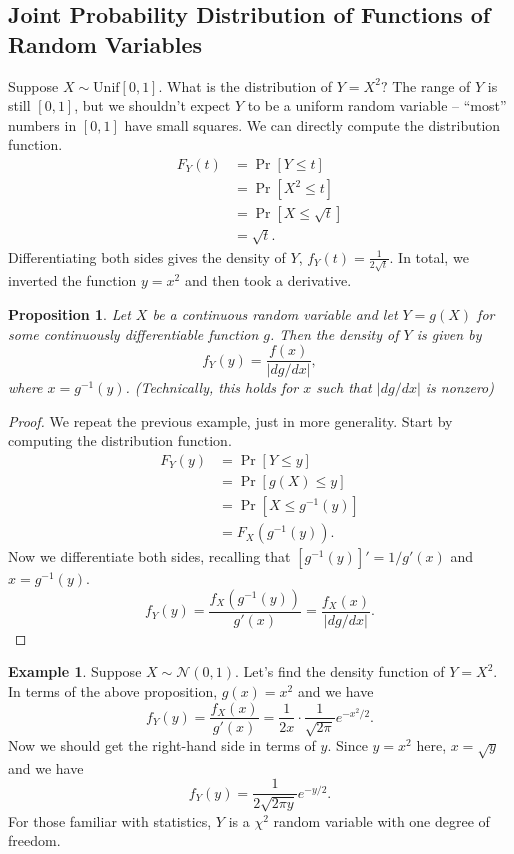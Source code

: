 \documentclass[12pt]{article}
\theoremstyle{plain}
\newtheorem{proposition}[theorem]{Proposition}
\theoremstyle{definition}
\newtheorem{example}[theorem]{Example}
\theoremstyle{remark}
\newcommand{\Unif}{\ensuremath{\textrm{Unif}}}
\begin{document}
\subsection{Joint Probability Distribution of Functions of Random Variables}

Suppose $X\sim \Unif [0,1]$.
What is the distribution of $Y = X^2?$
The range of $Y$ is still $[0,1]$, but we shouldn't expect $Y$ to be a uniform random variable -- ``most'' numbers in $[0,1]$ have small squares.
We can directly compute the distribution function.
\begin{align*}
    F_Y(t) &= \Pr[Y\leq t]\\
    &= \Pr[X^2 \leq t]\\
    &= \Pr[X \leq \sqrt{t}]\\
    &= \sqrt{t}.
\end{align*}
Differentiating both sides gives the density of $Y$, $f_Y(t) = \frac{1}{2\sqrt{t}}$.
In total, we inverted the function $y = x^2$ and then took a derivative.
\begin{proposition}
    Let $X$ be a continuous random variable and let $Y = g(X)$ for some continuously differentiable function $g$.
    Then the density of $Y$ is given by
    \[
        f_Y(y) = \frac{f(x)}{|dg/dx|},
    \]
    where $x = g^{-1}(y)$.
    (Technically, this holds for $x$ such that $|dg/dx|$ is nonzero)
\end{proposition}
\begin{proof}
    We repeat the previous example, just in more generality.
    Start by computing the distribution function.
    \begin{align*}
        F_Y(y) &= \Pr[Y\leq y]\\
        &= \Pr[g(X)\leq y]\\
        &= \Pr[X \leq g^{-1}(y)]\\
        &= F_X(g^{-1}(y)).
    \end{align*}
    Now we differentiate both sides, recalling that $[g^{-1}(y)]' = 1/g'(x)$ and $x = g^{-1}(y)$.
    \[
        f_Y(y) = \frac{f_X(g^{-1}(y))}{g'(x)} = \frac{f_X(x)}{|dg/dx|}.
    \]
\end{proof}


\begin{example}
    Suppose $X\sim \mathcal{N}(0, 1)$.
    Let's find the density function of $Y = X^2$.
    In terms of the above proposition, $g(x) = x^2$ and we have
    \[
        f_Y(y) = \frac{f_X(x)}{g'(x)} = \frac{1}{2x}\cdot \frac{1}{\sqrt{2\pi}}e^{-x^2/2}.
    \]
    Now we should get the right-hand side in terms of $y$.
    Since $y = x^2$ here, $x = \sqrt{y}$ and we have
    \[
        f_Y(y) = \frac{1}{2\sqrt{2\pi y}}e^{-y/2}.
    \]
    For those familiar with statistics, $Y$ is a $\chi^2$ random variable with one degree of freedom.
\end{example}
\end{document}

